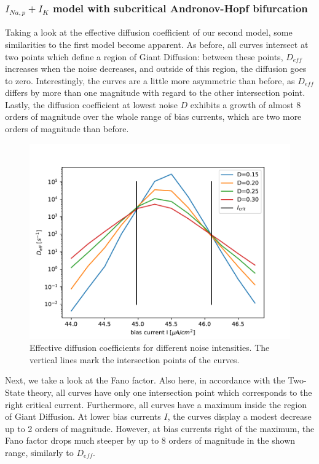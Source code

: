 \documentclass[12pt,a4paper]{article}
\begin{document}
\subsubsection{$I_{Na,p}+I_K$ model with subcritical Andronov-Hopf bifurcation}
Taking a look at the effective diffusion coefficient of our second model, some similarities to the first model become apparent. As before, all curves intersect at two points which define a region of Giant Diffusion: between these points, $D_{eff}$ increases when the noise decreases, and outside of this region, the diffusion goes to zero. Interestingly, the curves are a little more asymmetric than before, as $D_{eff}$ differs by more than one magnitude with regard to the other intersection point. Lastly, the diffusion coefficient at lowest noise $D$ exhibits a growth of almost 8 orders of magnitude over the whole range of bias currents, which are two more orders of magnitude than before. 
\begin{figure}[H]
	\centering
	\includegraphics[scale=1]{dneur3critrealanhopf26flogrealanhopf19flog.pdf}\caption{Effective diffusion coefficients for different noise intensities. The vertical lines mark the intersection points of the curves.}
	\label{deffanhopf}
\end{figure}
Next, we take a look at the Fano factor. Also here, in accordance with the Two-State theory, all curves have only one intersection point which corresponds to the right critical current. Furthermore, all curves have a maximum inside the region of Giant Diffusion. At lower bias currents $I$, the curves display a modest decrease up to 2 orders of magnitude. However, at bias currents right of the maximum, the Fano factor drops much steeper by up to 8 orders of magnitude in the shown range, similarly to $D_{eff}$.
\end{document}
